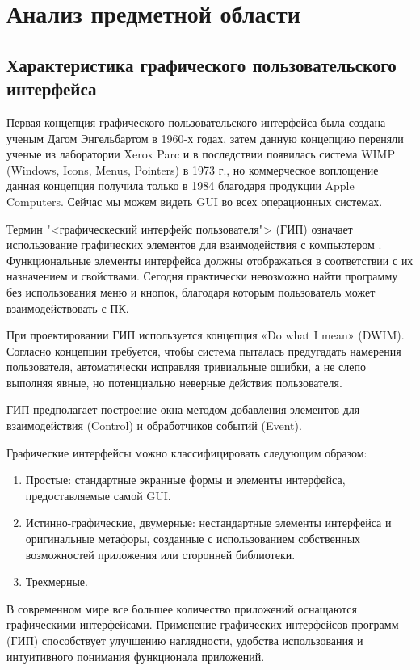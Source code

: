 \section{Анализ предметной области}
\subsection{Характеристика графического пользовательского интерфейса}

Первая концепция графического пользовательского интерфейса была создана ученым Дагом Энгельбартом в 1960-х годах, затем данную концепцию переняли ученые из лаборатории Xerox Parc и в последствии появилась система  WIMP (Windows, Icons, Menus, Pointers) в 1973 г., но коммерческое воплощение данная концепция получила только в 1984 благодаря продукции Apple Computers. Сейчас мы можем видеть GUI во всех операционных системах.

Термин "<графическеский интерфейс пользователя"> (ГИП) означает использование графических элементов для взаимодействия с компьютером \cite{gui}. Функциональные элементы интерфейса должны отображаться в соответствии с их назначением и свойствами. Сегодня практически невозможно найти программу без использования меню и кнопок, благодаря которым пользователь может взаимодействовать с ПК. 

При проектировании ГИП используется концепция «Do what I mean» (DWIM). Согласно концепции требуется, чтобы система пыталась предугадать намерения пользователя, автоматически исправляя тривиальные ошибки, а не слепо выполняя явные, но потенциально неверные действия пользователя.

ГИП предполагает построение окна методом добавления элементов для взаимодействия (Control) и обработчиков событий (Event).     

Графические интерфейсы можно классифицировать следующим образом:

\begin{enumerate}
\item Простые: стандартные экранные формы и элементы интерфейса, предоставляемые самой GUI.
\item Истинно-графические, двумерные: нестандартные элементы интерфейса и оригинальные метафоры, созданные с использованием собственных возможностей приложения или сторонней библиотеки.
\item Трехмерные.
\end{enumerate}

В современном мире все большее количество приложений оснащаются графическими интерфейсами. Применение графических интерфейсов программ (ГИП) способствует улучшению наглядности, удобства использования и интуитивного понимания функционала приложений.  

